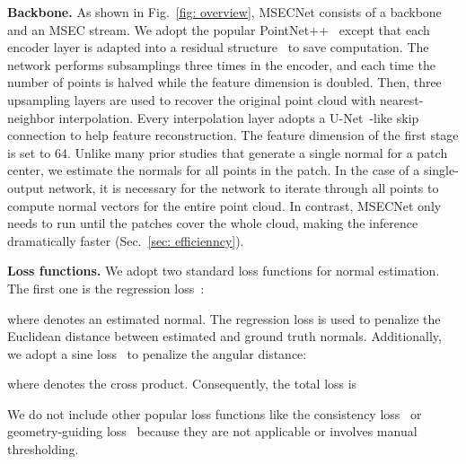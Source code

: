 \documentclass[sigconf]{acmart}
\begin{document}
\textbf{Backbone.}
As shown in Fig.~\ref{fig: overview}, MSECNet consists of a backbone and an MSEC stream. We adopt the popular PointNet++~\cite{qi2017pointnet++} except that each encoder layer is adapted into a residual structure~\cite{he2016deep} to save computation. The network performs subsamplings three times in the encoder, and each time the number of points is halved while the feature dimension is doubled. Then, three upsampling layers are used to recover the original point cloud with nearest-neighbor interpolation. Every interpolation layer adopts a U-Net~\cite{unet}-like skip connection to help feature reconstruction. The feature dimension of the first stage is set to 64. 
Unlike many prior studies that generate a single normal for a patch center, we estimate the normals for all points in the patch.
In the case of a single-output network, it is necessary for the network to iterate through all points to compute normal vectors for the entire point cloud. 
In contrast, MSECNet only needs to run until the patches cover the whole cloud, making the inference dramatically faster (Sec.~\ref{sec: efficienncy}). 

\indent 

\textbf{Loss functions.}
We adopt two standard loss functions for normal estimation. The first one is the regression loss~\cite{guerrero2018pcpnet,zhang2022geometry}: 

where  denotes an estimated normal. The regression loss is used to penalize the Euclidean distance between estimated and ground truth normals. Additionally, we adopt a sine loss~\cite{ben2020deepfit,li2022hsurf} to penalize the angular distance:

where  denotes the cross product. Consequently, the total loss is

We do not include other popular loss functions like the consistency loss~\cite{ben2020deepfit,zhu2021adafit,li2022graphfit} or geometry-guiding loss~\cite{zhang2022geometry,li2022hsurf} because they are not applicable or involves manual thresholding.  
\end{document}
